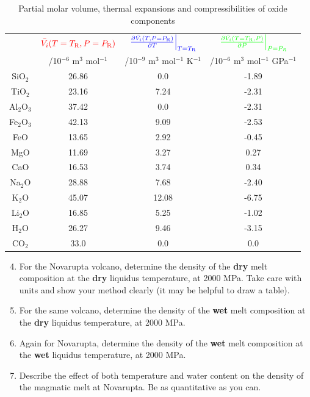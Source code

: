 \documentclass[]{book}
\theoremstyle{definition}
\begin{document}
\begin{enumerate}
  \begin{table}
    \centering
    \caption{Partial molar volume, thermal expansions and compressibilities of oxide components \label{tab:mol_vol}}
    \begin{tabular}{|c|c|c|c|}
      \hline
      & $\textcolor{red}{\bar{V_{i}}(T = T_{\text{R}}, P = P_{\text{R}})}$ & $\textcolor{blue}{\left.\frac{\partial \bar{V_{i}}(T, P = P_{\text{R}})}{\partial T}\right|_{T = T_{\text{R}}}}$ & $\textcolor{green}{\left.\frac{\partial \bar{V_{i}}(T = T_{\text{R}}, P)}{\partial P}\right|_{P = P_{R}}}$ \\
      & /10$^{-6}$ m$^{3}$ mol$^{-1}$ & /10$^{-9}$ m$^{3}$ mol$^{-1}$ K$^{-1}$ & /10$^{-6}$ m$^{3}$ mol$^{-1}$ GPa$^{-1}$ \\
      \hline
      SiO$_{2}$ & 26.86 & 0.0 & -1.89 \\
      TiO$_{2}$ & 23.16 & 7.24 & -2.31 \\
      Al$_{2}$O$_{3}$ & 37.42 & 0.0 & -2.31 \\
      Fe$_{2}$O$_{3}$ & 42.13 & 9.09 & -2.53 \\
      FeO & 13.65 & 2.92 & -0.45 \\
      MgO & 11.69 & 3.27 & 0.27 \\
      CaO & 16.53 & 3.74 & 0.34 \\
      Na$_{2}$O & 28.88 & 7.68 & -2.40 \\
      K$_{2}$O & 45.07 & 12.08 & -6.75 \\
      Li$_{2}$O & 16.85 & 5.25 & -1.02 \\
      H$_{2}$O & 26.27 & 9.46 & -3.15 \\
      CO$_{2}$ & 33.0 & 0.0 & 0.0 \\
      \hline  
    \end{tabular}
  \end{table}

  \begin{enumerate}\setcounter{enumii}{3}
  \item For the Novarupta volcano, determine the density of the \textbf{dry} melt composition at the \textbf{dry} liquidus temperature, at 2000 MPa. Take care with units and show your method clearly (it may be helpful to draw a table). 
  \item For the same volcano, determine the density of the \textbf{wet} melt composition at the \textbf{dry} liquidus temperature, at 2000 MPa.
  \item Again for Novarupta, determine the density of the \textbf{wet} melt composition at the \textbf{wet} liquidus temperature, at 2000 MPa.
  \item Describe the effect of both temperature and water content on the density of the magmatic melt at Novarupta. Be as quantitative as you can.
  \end{enumerate}


\end{enumerate}
\end{document}
